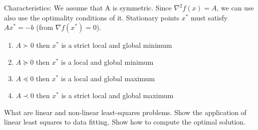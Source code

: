 \documentclass[12pt,a4paper]{article}
\begin{document}
Characteristics: 
We assume that A is symmetric. Since $\nabla^2 f(x) = A$, we can use also use the optimality conditions of it. Stationary points $x^*$ must satisfy $Ax^*=-b$ (from $\nabla f(x^*) = 0$).
\begin{enumerate}
    \item $A \succ 0$ then $x^*$ is a strict local and global minimum
    \item $A \succeq 0$ then $x^*$ is a local and global minimum
    \item $A \preceq 0$ then $x^*$ is a local and global maximum
    \item $A \prec 0$ then $x^*$ is a strict local and global maximum
\end{enumerate}
%

\begin{question}
What are linear and non-linear least-squares problems. Show the application of linear least squares to data fitting. Show how to compute the optimal solution.
\end{question}
\end{document}
